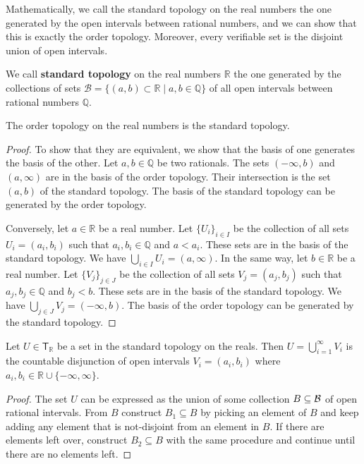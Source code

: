 Mathematically, we call the standard topology on the real numbers the one generated by the open intervals between rational numbers, and we can show that this is exactly the order topology. Moreover, every verifiable set is the disjoint union of open intervals.

\begin{mathSection}
	\begin{defn}
		We call \textbf{standard topology} on the real numbers $\mathbb{R}$ the one generated by the collections of sets $\mathcal{B} = \{ (a,b) \subset \mathbb{R} \; | \; a,b \in \mathbb{Q} \}$ of all open intervals between rational numbers $\mathbb{Q}$.
	\end{defn}
	\begin{prop}
		The order topology on the real numbers is the standard topology.
	\end{prop}
	\begin{proof}
		To show that they are equivalent, we show that the basis of one generates the basis of the other. Let $a,b \in \mathbb{Q}$ be two rationals. The sets $(-\infty, b)$ and $(a, \infty)$ are in the basis of the order topology. Their intersection is the set $(a, b)$ of the standard topology. The basis of the standard topology can be generated by the order topology.
		
		Conversely, let $a \in \mathbb{R}$ be a real number. Let $\{U_i\}_{i \in I}$ be the collection of all sets $U_i = (a_i, b_i)$ such that $a_i, b_i \in \mathbb{Q}$ and $a < a_i$. These sets are in the basis of the standard topology. We have $\bigcup\limits_{i \in I} U_i = (a, \infty)$. In the same way, let $b \in \mathbb{R}$ be a real number. Let $\{V_j\}_{j \in J}$ be the collection of all sets $V_j = (a_j, b_j)$ such that $a_j, b_j \in \mathbb{Q}$ and $b_j < b$. These sets are in the basis of the standard topology. We have $\bigcup\limits_{j \in J} V_j = (-\infty, b)$. The basis of the order topology can be generated by the standard topology.
	\end{proof}
	\begin{prop}\label{pm-pq-realOpenSetsAreIntervals}
		Let $U \in \mathsf{T}_\mathbb{R}$ be a set in the standard topology on the reals. Then $U = \bigcup\limits_{i=1}^{\infty} V_i$ is the countable disjunction of open intervals $V_i = (a_i,b_i)$ where $a_i, b_i \in \mathbb{R} \cup \{ -\infty, \infty \}$.
	\end{prop}
	\begin{proof}
		The set $U$ can be expressed as the union of some collection $B \subseteq \mathcal{B}$ of open rational intervals. From $B$ construct $B_1 \subseteq B$ by picking an element of $B$ and keep adding any element that is not-disjoint from an element in $B$. If there are elements left over, construct $B_2 \subseteq B$ with the same procedure and continue until there are no elements left.
		

\end{proof}
\end{mathSection}
